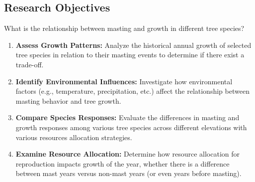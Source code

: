\documentclass[12pt,letter]{article}
\begin{document}
\subsection{Research Objectives}
What is the relationship between masting and growth in different tree species?
	\begin{enumerate}
	\item \textbf{Assess Growth Patterns:} Analyze the historical annual growth of selected tree species in relation to their masting events to determine if there exist a trade-off.
	\item \textbf{Identify Environmental Influences:} Investigate how environmental factors (e.g., temperature, precipitation, etc.) affect the relationship between masting behavior and tree growth.
	\item \textbf{Compare Species Responses:} Evaluate the differences in masting and growth responses among various tree species across different elevations with various resources allocation strategies.
	\item \textbf{Examine Resource Allocation:} Determine how resource allocation for reproduction impacts growth of the year, whether there is a difference between mast years versus non-mast years (or even years before masting).
	\end{enumerate}
\end{document}
